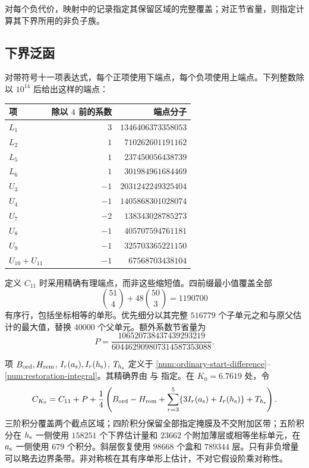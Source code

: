 对每个负代价，映射中的记录指定其保留区域的完整覆盖；对正节省量，则指定计算其下界所用的非负子族。

\subsection{下界泛函}
对带符号十一项表达式，每个正项使用下端点，每个负项使用上端点。下列整数除以 $10^{14}$ 后给出这样的端点：
\begin{center}
\begin{tabular}{@{}l r r@{}}
\toprule 项 & 除以 $4$ 前的系数 & 端点分子\\
\midrule
$L_1$ & $3$ & $1346406373358053$\\
$L_2$ & $1$ & $710262601191162$\\
$L_5$ & $1$ & $237450056438739$\\
$L_6$ & $1$ & $301984961684469$\\
$U_3$ & $-1$ & $2031242249325404$\\
$U_4$ & $-1$ & $1405868301028074$\\
$U_7$ & $-2$ & $138343028785273$\\
$U_8$ & $-1$ & $405707594761181$\\
$U_9$ & $-1$ & $325703365221150$\\
$U_{10}+U_{11}$ & $-1$ & $67568703438104$\\
\bottomrule
\end{tabular}
\end{center}
定义 $C_{11}$ 时采用精确有理端点，而非这些缩短值。四前缀最小值覆盖全部
\[
 \binom{51}{4}+48\binom{50}{3}=1190700
\]
有序行，包括坐标相等的单形。优先细分以其完整 $516779$ 个子单元之和与原父估计的最大值，替换 $40000$ 个父单元。额外系数节省量为
\[
 P=\frac{106520738437439293219}{604462909807314587353088}.
\]

项 $B_{\rm ord},H_{\rm rem}$, $I_r(a_{\rm s}),I_r(h_{\rm s})$, $T_{h_{\rm s}}$ 定义于 \eqref{num:ordinary-start-difference}--\eqref{num:restoration-integral}。其精确界由  与  指定。在 $K_0=6.7619$ 处，令
\[
 C_{K_0}=C_{11}+P+\frac14\left(
 B_{\rm ord}-H_{\rm rem}
 +\sum_{r=3}^5\{3I_r({a_{\rm s}})+I_r({h_{\rm s}})\}+T_{h_{\rm s}}\right).
\]
三阶积分覆盖两个截点区域；四阶积分保留全部指定掩膜及不交附加区带；五阶积分在 ${h_{\rm s}}$ 一侧使用 $158251$ 个下界估计量和 $23662$ 个附加薄层或相等坐标单元，在 ${a_{\rm s}}$ 一侧使用 $679$ 个积分。斜层恢复使用 $98668$ 个盒和 $789344$ 层。只有非负增量可以略去边界条带。非对称核在其有序单形上估计，不对它假设阶乘对称性。

